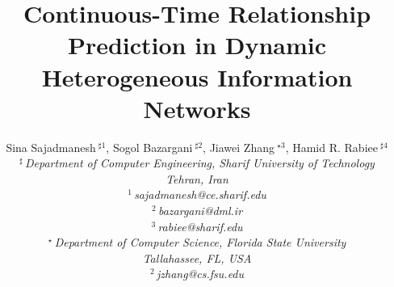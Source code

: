 \documentclass[10pt,conference,letterpaper]{IEEEtran}
\title{Continuous-Time Relationship Prediction in Dynamic Heterogeneous Information Networks}
\author{%
{Sina Sajadmanesh{\small $~^{\sharp1}$}, Sogol Bazargani{\small $~^{\sharp2}$}, Jiawei Zhang{\small $~^{\star3}$}, Hamid R. Rabiee{\small $~^{\sharp4}$} }%
\vspace{1.6mm}\\
\fontsize{10}{10}\selectfont\itshape
$^{\sharp}$\,Department of Computer Engineering, Sharif University of Technology\\
Tehran, Iran\\
\fontsize{9}{9}\selectfont\ttfamily\upshape
%
$^{1}$\,sajadmanesh@ce.sharif.edu\\
$^{2}$\,bazargani@dml.ir\\
$^{3}$\,rabiee@sharif.edu%
\vspace{1.2mm}\\
\fontsize{10}{10}\selectfont\rmfamily\itshape
$^{\star}$\,Department of Computer Science, Florida State University\\
Tallahassee, FL, USA\\
\fontsize{9}{9}\selectfont\ttfamily\upshape
$^{2}$\,jzhang@cs.fsu.edu
}
\begin{document}
\maketitle
%
\newtheorem{definition}{Definition}
\newcommand{\descr}[1]{\smallskip\noindent\textbf{#1}}
\newcommand{\npglm}{{\textsc{Np-Glm}}\xspace}
\newcommand{\mb}[1]{\mathbf{#1}}
\newcommand{\mc}[1]{\mathcal{#1}}
\newcommand\xrsquigarrow[1]{%
	\stepcounter{sarrow}%
	\begin{tikzpicture}[decoration=snake]
	\node (\thesarrow) {\strut#1};
	\draw[->,decorate] (\thesarrow.south west) -- (\thesarrow.south east);
	\end{tikzpicture}%
}









%
%


\balance

\end{document}
